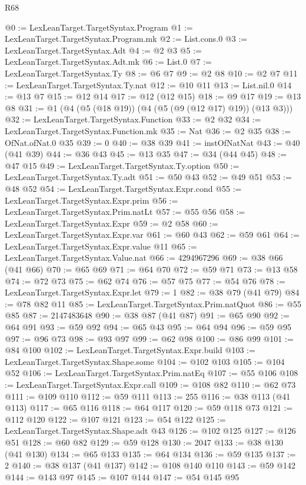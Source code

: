 \begin{lexlean}{R68}
\begin{coremodule}
@0 := LexLeanTarget.TargetSyntax.Program
@1 := LexLeanTarget.TargetSyntax.Program.mk
@2 := List.cons.{0}
@3 := LexLeanTarget.TargetSyntax.Adt
@4 := @2 @3
@5 := LexLeanTarget.TargetSyntax.Adt.mk
@6 := List.{0}
@7 := LexLeanTarget.TargetSyntax.Ty
@8 := @6 @7
@9 := @2 @8
@10 := @2 @7
@11 := LexLeanTarget.TargetSyntax.Ty.nat
@12 := @10 @11
@13 := List.nil.{0}
@14 := @13 @7
@15 := @12 @14
@17 := @12 (@12 @15)
@18 := @9 @17
@19 := @13 @8
@31 := @1 (@4 (@5 (@18 @19)) (@4 (@5 (@9 (@12 @17) @19)) (@13 @3)))
@32 := LexLeanTarget.TargetSyntax.Function
@33 := @2 @32
@34 := LexLeanTarget.TargetSyntax.Function.mk
@35 := Nat
@36 := @2 @35
@38 := OfNat.ofNat.{0} @35
@39 := 0
@40 := @38 @39
@41 := instOfNatNat
@43 := @40 (@41 @39)
@44 := @36 @43
@45 := @13 @35
@47 := @34 (@44 @45)
@48 := @47 @15
@49 := LexLeanTarget.TargetSyntax.Ty.option
@50 := LexLeanTarget.TargetSyntax.Ty.adt
@51 := @50 @43
@52 := @49 @51
@53 := @48 @52
@54 := LexLeanTarget.TargetSyntax.Expr.cond
@55 := LexLeanTarget.TargetSyntax.Expr.prim
@56 := LexLeanTarget.TargetSyntax.Prim.natLt
@57 := @55 @56
@58 := LexLeanTarget.TargetSyntax.Expr
@59 := @2 @58
@60 := LexLeanTarget.TargetSyntax.Expr.var
@61 := @60 @43
@62 := @59 @61
@64 := LexLeanTarget.TargetSyntax.Expr.value @11
@65 := LexLeanTarget.TargetSyntax.Value.nat
@66 := 4294967296
@69 := @38 @66 (@41 @66)
@70 := @65 @69
@71 := @64 @70
@72 := @59 @71
@73 := @13 @58
@74 := @72 @73
@75 := @62 @74
@76 := @57 @75
@77 := @54 @76
@78 := LexLeanTarget.TargetSyntax.Expr.let
@79 := 1
@82 := @38 @79 (@41 @79)
@84 := @78 @82 @11
@85 := LexLeanTarget.TargetSyntax.Prim.natQuot
@86 := @55 @85
@87 := 2147483648
@90 := @38 @87 (@41 @87)
@91 := @65 @90
@92 := @64 @91
@93 := @59 @92
@94 := @65 @43
@95 := @64 @94
@96 := @59 @95
@97 := @96 @73
@98 := @93 @97
@99 := @62 @98
@100 := @86 @99
@101 := @84 @100
@102 := LexLeanTarget.TargetSyntax.Expr.build
@103 := LexLeanTarget.TargetSyntax.Shape.some
@104 := @102 @103
@105 := @104 @52
@106 := LexLeanTarget.TargetSyntax.Prim.natEq
@107 := @55 @106
@108 := LexLeanTarget.TargetSyntax.Expr.call
@109 := @108 @82
@110 := @62 @73
@111 := @109 @110
@112 := @59 @111
@113 := 255
@116 := @38 @113 (@41 @113)
@117 := @65 @116
@118 := @64 @117
@120 := @59 @118 @73
@121 := @112 @120
@122 := @107 @121
@123 := @54 @122
@125 := LexLeanTarget.TargetSyntax.Shape.adt @43
@126 := @102 @125
@127 := @126 @51
@128 := @60 @82
@129 := @59 @128
@130 := 2047
@133 := @38 @130 (@41 @130)
@134 := @65 @133
@135 := @64 @134
@136 := @59 @135
@137 := 2
@140 := @38 @137 (@41 @137)
@142 := @108 @140 @110
@143 := @59 @142
@144 := @143 @97
@145 := @107 @144
@147 := @54 @145 @95

\end{coremodule}
\end{lexlean}
